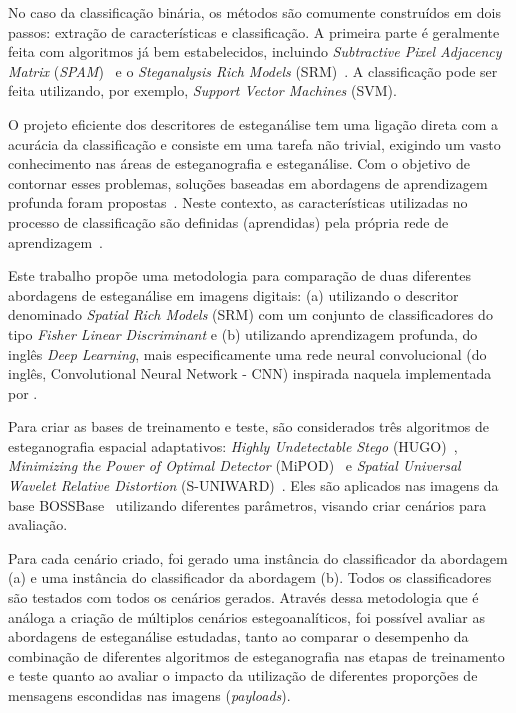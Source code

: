 No caso da classificação binária, os métodos são comumente construídos em dois passos: extração de características e classificação. A primeira parte é geralmente feita com algoritmos já bem estabelecidos, incluindo \textit{Subtractive Pixel Adjacency Matrix} (\textit{SPAM})~\cite{spam} e o \textit{Steganalysis Rich Models} (SRM)~\cite{fridrich2012rich}. A classificação pode ser feita utilizando, por exemplo, \textit{Support Vector Machines} (SVM).

O projeto eficiente dos descritores de esteganálise tem uma ligação direta com a acurácia da classificação e consiste em uma tarefa não trivial, exigindo um vasto conhecimento nas áreas de esteganografia e esteganálise. Com o objetivo de contornar esses problemas, soluções baseadas em abordagens de aprendizagem profunda foram propostas~\cite{tan2014stacked,qian2015deep,cnn_base,xu2016ensemble}. Neste contexto, as características utilizadas no processo de classificação são definidas (aprendidas) pela própria rede de aprendizagem~\cite{wu2017deep}.

Este trabalho propõe uma metodologia para comparação de duas diferentes abordagens de esteganálise em imagens digitais: (a) utilizando o descritor denominado \textit{Spatial Rich Models} (SRM) com um conjunto de classificadores do tipo \textit{Fisher Linear Discriminant} e (b) utilizando aprendizagem profunda, do inglês \textit{Deep Learning}, mais especificamente uma rede neural convolucional (do inglês, Convolutional Neural Network - CNN) inspirada naquela implementada por . 

Para criar as bases de treinamento e teste, são considerados três algoritmos de esteganografia espacial adaptativos: \textit{Highly Undetectable Stego} (HUGO)~\cite{hugo}, \textit{Minimizing the Power of Optimal Detector} (MiPOD)~\cite{sedighi2016content} e \textit{Spatial Universal Wavelet Relative Distortion} (S-UNIWARD)~\cite{holub2014universal}. Eles são aplicados nas imagens da base BOSSBase~\cite{bas2011break} utilizando diferentes parâmetros, visando criar cenários para avaliação. 

Para cada cenário criado, foi gerado uma instância do classificador da abordagem (a) e uma instância do classificador da abordagem (b). Todos os classificadores são testados com todos os cenários gerados. Através dessa metodologia que é análoga a criação de múltiplos cenários estegoanalíticos, foi possível avaliar as abordagens de esteganálise estudadas, tanto ao comparar o desempenho da combinação de diferentes algoritmos de esteganografia nas etapas de treinamento e teste quanto ao avaliar o impacto da utilização de diferentes proporções de mensagens escondidas nas imagens (\textit{payloads}).


